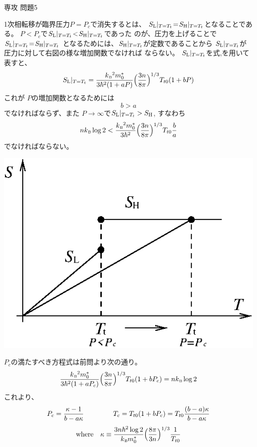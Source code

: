 \documentclass[fleqn]{jbook}
\begin{document}
\begin{answer}{専攻 問題5}{}
\begin{subanswers}
\SubAnswer
  \parbox[t]{90mm}{
  1次相転移が臨界圧力$P\!=\!P_c$で消失するとは、
  $S_{\rm L}|_{T=T_t}\!=\!S_{\rm H}|_{T=T_t}$となることである。
  $P\!<\!P_c$で$S_{\rm L}|_{T=T_t}\!<\!S_{\rm H}|_{T=T_t}$であった
  のが、圧力を上げることで$S_{\rm L}|_{T=T_t}\!=\!S_{\rm H}|_{T=T_t}$
  となるためには、$S_{\rm H}|_{T=T_t}$が定数であることから
  $S_{\rm L}|_{T=T_t}$が圧力に対して右図の様な増加関数でなければ
  ならない。
  $S_{\rm L}|_{T=T_t}$を式,を用いて表すと、
%
  \[ S_{\rm L}|_{T=T_t} = \frac{\kB ^2m_0^\ast}{3\hbar^2(1+aP)}%
     \Bigl(\frac{3n}{8\pi}\Bigr)^{1/3} T_{t0}(1+bP) \]
%
  これが $P$の増加関数となるためには%
  \[ b > a \]
でなければならず、また
$P\to \infty$で$S_{\rm L}|_{T=T_t}>S_{\rm H}$, すなわち\[
n\kB\log{2}<\frac{\kB ^2m_0^\ast}{3\hbar^2}%
     \Bigl(\frac{3n}{8\pi}\Bigr)^{1/3} T_{t0}\frac{b}{a}
\]
  でなければならない。
  }\parbox[t]{70mm}{
  \begin{center}
    \mbox{\includegraphics[clip]{1996phy5-3.eps}}
  \end{center}}

\SubAnswer
  $P_c$の満たすべき方程式は前問より次の通り。
%
  \[ \frac{\kB^2m_0^\ast}{3\hbar^2(1+aP_c)}%
     \Bigl(\frac{3n}{8\pi}\Bigr)^{1/3} T_{t0}(1+bP_c)
     = n\kB \log{2} \]
%
  これより、
%
  \[ P_c = \frac{\kappa-1}{b-a\kappa} \hspace{15mm}
     T_c = T_{t0}(1+bP_c)
         = T_{t0} \frac{(b-a)\kappa}{b-a\kappa} \]
  \[ {\rm where}\quad%
     \kappa \equiv \frac{3n\hbar^2\log{2}}{\kB m_0^\ast}%
              \Bigl( \frac{8\pi}{3n} \Bigr)^{1/3}\frac{1}{T_{t0}} \]

\end{subanswers}
\end{answer}
\end{document}

